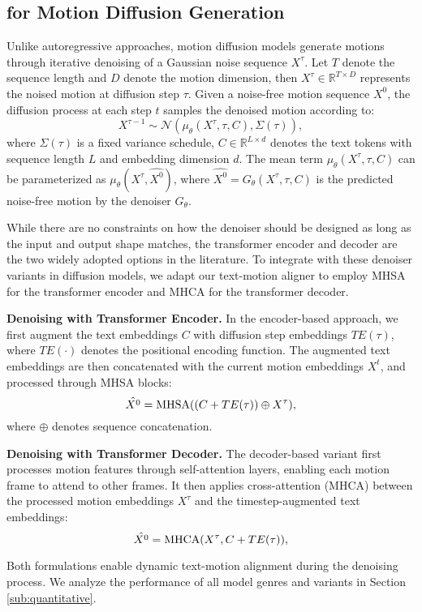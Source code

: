 \vspace{-3pt}
\subsection{{\modulename} for Motion Diffusion Generation}
\label{sub:duffsion}
\vspace{-1pt}

Unlike autoregressive approaches, motion diffusion models generate motions through iterative denoising of a Gaussian noise sequence $X^\tau$. Let $T$ denote the sequence length and $D$ denote the motion dimension, then $X^\tau \in \mathbb{R}^{T \times D}$ represents the noised motion at diffusion step $\tau$. Given a noise-free motion sequence $X^0$, the diffusion process at each step $t$ samples the denoised motion according to:
\begin{equation}
X^{\tau-1} \sim \mathcal{N}(\mu_{\theta}(X^\tau, \tau, C), \Sigma(\tau)),
\end{equation}
where $\Sigma(\tau)$ is a fixed variance schedule, $C \in \mathbb{R}^{L \times d}$ denotes the text tokens with sequence length $L$ and embedding dimension $d$. The mean term $\mu_{\theta}(X^\tau, \tau, C)$ can be parameterized as $\mu_{\theta}(X^\tau, \hat{X^0})$, where $\hat{X^0}=G_\theta(X^\tau, \tau, C)$ is the predicted noise-free motion by the denoiser $G_\theta$.

While there are no constraints on how the denoiser should be designed as long as the input and output shape matches, the transformer encoder and decoder are the two widely adopted options in the literature.
To integrate {\modulename} with these denoiser variants in diffusion models, we adapt our text-motion aligner to employ MHSA for the transformer encoder and MHCA for the transformer decoder.


\textbf{Denoising with Transformer Encoder.} In the encoder-based approach, we first augment the text embeddings $C$ with diffusion step embeddings $TE(\tau)$, where $TE(\cdot)$ denotes the positional encoding function. The augmented text embeddings are then concatenated with the current motion embeddings $X^t$, and processed through MHSA blocks:
\begin{equation}
\hat{X^0} = \operatorname{MHSA}( (C+TE(\tau))\oplus X^\tau),
\end{equation}
where $\oplus$ denotes sequence concatenation.

\textbf{Denoising with Transformer Decoder.} The decoder-based variant first processes motion features through self-attention layers, enabling each motion frame to attend to other frames. It then applies cross-attention (MHCA) between the processed motion embeddings $X^\tau$ and the timestep-augmented text embeddings:
\begin{equation}
\hat{X^0}  = \operatorname{MHCA}(X^\tau, C+TE(\tau)),
\end{equation}

Both formulations enable dynamic text-motion alignment during the denoising process. 
We analyze the performance of all model genres and variants in Section \ref{sub:quantitative}.



